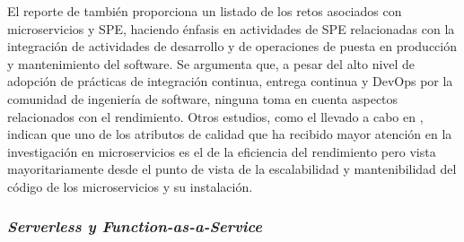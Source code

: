 El reporte de \cite{DBLP:journals/corr/BrunnertHWDHHHJ15} también proporciona un listado de los retos asociados con microservicios y SPE, haciendo énfasis en actividades de SPE relacionadas con la integración de actividades de desarrollo y de operaciones de puesta en producción y mantenimiento del software. Se argumenta que, a pesar del alto nivel de adopción de prácticas de integración continua, entrega continua y DevOps por la comunidad de ingeniería de software, ninguna toma en cuenta aspectos relacionados con el rendimiento. Otros estudios, como el llevado a cabo en \cite{7930195}, indican que uno de los atributos de calidad que ha recibido mayor atención en la investigación en microservicios es el de la eficiencia del rendimiento pero vista mayoritariamente desde el punto de vista de la escalabilidad y mantenibilidad del código de los microservicios y su instalación.



\subsubsection{\emph{Serverless y Function-as-a-Service}}
%
%

